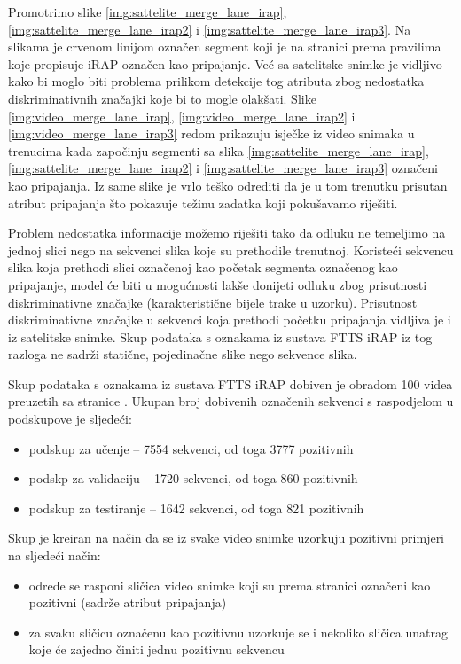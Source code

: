 \documentclass[times, utf8, diplomski, numeric]{fer}
\begin{document}
Promotrimo slike \ref{img:sattelite_merge_lane_irap}, \ref{img:sattelite_merge_lane_irap2} i \ref{img:sattelite_merge_lane_irap3}. Na slikama je crvenom linijom označen segment koji je na stranici \citep{url:ftts_irap} prema pravilima koje propisuje iRAP označen kao pripajanje. 
Već sa satelitske snimke je vidljivo kako bi moglo biti problema prilikom detekcije tog atributa zbog nedostatka diskriminativnih značajki koje bi to mogle olakšati.
Slike \ref{img:video_merge_lane_irap}, \ref{img:video_merge_lane_irap2} i \ref{img:video_merge_lane_irap3} redom prikazuju isječke iz video snimaka u trenucima kada započinju segmenti sa slika \ref{img:sattelite_merge_lane_irap}, \ref{img:sattelite_merge_lane_irap2} i \ref{img:sattelite_merge_lane_irap3} označeni kao pripajanja. 
Iz same slike je vrlo teško odrediti da je u tom trenutku prisutan atribut pripajanja što pokazuje težinu zadatka koji pokušavamo riješiti.

Problem nedostatka informacije možemo riješiti tako da odluku ne temeljimo na jednoj slici nego na sekvenci slika koje su prethodile trenutnoj. 
Koristeći sekvencu slika koja prethodi slici označenoj kao početak segmenta označenog kao pripajanje, model će biti u mogućnosti lakše donijeti odluku zbog prisutnosti diskriminativne značajke (karakteristične bijele trake u uzorku).
Prisutnost diskriminativne značajke u sekvenci koja prethodi početku pripajanja vidljiva je i iz satelitske snimke.
Skup podataka s oznakama iz sustava FTTS iRAP iz tog razloga ne sadrži statične, pojedinačne slike nego sekvence slika.

Skup podataka s oznakama iz sustava FTTS iRAP dobiven je obradom 100 videa preuzetih sa stranice \citep{url:ftts_irap}. 
Ukupan broj dobivenih označenih sekvenci s raspodjelom u podskupove je sljedeći:
\begin{itemize}
 \item podskup za učenje -- 7554 sekvenci, od toga 3777 pozitivnih
 \item podskp za validaciju -- 1720 sekvenci, od toga 860 pozitivnih
 \item podskup za testiranje -- 1642 sekvenci, od toga 821 pozitivnih
\end{itemize}

\noindent Skup je kreiran na način da se iz svake video snimke uzorkuju pozitivni primjeri na sljedeći način: 
\begin{itemize}
 \item odrede se rasponi sličica video snimke koji su prema stranici \citep{url:ftts_irap} označeni kao pozitivni (sadrže atribut pripajanja)
 \item za svaku sličicu označenu kao pozitivnu uzorkuje se i nekoliko sličica unatrag koje će zajedno činiti jednu pozitivnu sekvencu
\end{itemize}
\end{document}
